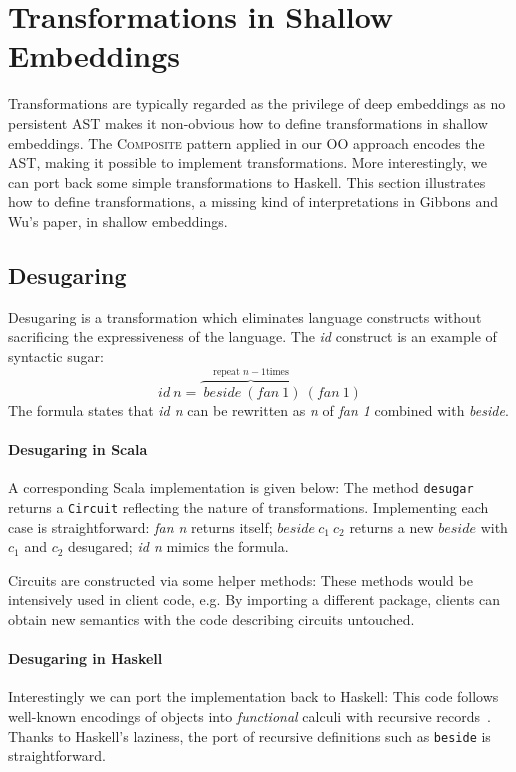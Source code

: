 \section{Transformations in Shallow Embeddings}
Transformations are typically regarded as the privilege of deep embeddings as no
persistent AST makes it non-obvious how to define transformations in shallow embeddings.
The \textsc{Composite} pattern applied in our OO approach encodes the AST, making
it possible to implement transformations. More interestingly, we can port back
some simple transformations to Haskell.
This section illustrates how to define transformations, a missing kind
of interpretations in Gibbons and Wu's paper, in shallow embeddings.

\subsection{Desugaring}
Desugaring is a transformation which eliminates 
language constructs without sacrificing the expressiveness of the language.
The \emph{id} construct is an example of syntactic sugar:
\vspace{-5pt}
$$id\ n = \overbrace{\ beside\ (fan\ 1)}^{\text{repeat }n-1\text{
    times}}\ (fan\ 1)$$
\noindent The formula states that \emph{id n} can be rewritten as \emph{n} of \emph{fan 1}
combined with \emph{beside}.

\vspace{-3pt}
\paragraph{Desugaring in Scala}
A corresponding Scala implementation is given below:
The method \lstinline{desugar} returns a
\lstinline{Circuit} reflecting the nature of transformations.
Implementing each case is straightforward:
\emph{fan n} returns itself; $beside\ c_1\ c_2$ returns a new
$beside$ with $c_1$ and $c_2$ desugared; \emph{id n} mimics the
formula.

Circuits are constructed via some helper methods:
These methods would be intensively used in client code, e.g.
By importing a different package, clients can obtain new semantics with the code
describing circuits untouched.

\vspace{-3pt}\paragraph{Desugaring in Haskell}
Interestingly we can port the implementation back to Haskell:
\noindent This code follows well-known encodings of objects into 
\emph{functional} calculi with recursive records~\cite{bruce97comparing}. Thanks 
to Haskell's laziness, the port of recursive definitions such as
\lstinline{beside} is straightforward.  

